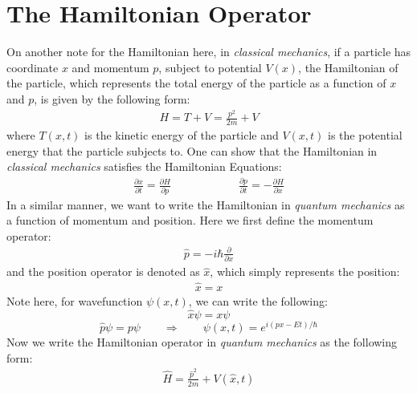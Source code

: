 \documentclass[11pt]{book}
\theoremstyle{break}
\theoremstyle{break}
\newcommand{\pd}{\partial}
\begin{document}
\section[The Hamiltonian Operator]{\color{red}The Hamiltonian Operator\color{black}}
On another note for the Hamiltonian here, in \textit{classical mechanics}, if a particle has coordinate $x$ and momentum $p$, subject to potential $V(x)$, the Hamiltonian of the particle, which represents the total energy of the particle as a function of $x$ and $p$, is given by the following form:
\begin{align*}
H = T+V = \frac{p^2}{2m}+V
\end{align*}
where $T(x,t)$ is the kinetic energy of the particle and $V(x,t)$ is the potential energy that the particle subjects to. One can show that the Hamiltonian in \textit{classical mechanics} satisfies the Hamiltonian Equations:
\begin{align*}
\frac{\pd x}{\pd t} = \frac{\pd H}{\pd p}  \qquad\qquad\qquad \frac{\pd p}{\pd t} = -\frac{\pd H}{\pd x}
\end{align*}
In a similar manner, we want to write the Hamiltonian in \textit{quantum mechanics} as a function of momentum and position. Here we first define the momentum operator:
\begin{align*}
\hat{p} = -i\hbar \frac{\pd}{\pd x}
\end{align*}
and the position operator is denoted as $\hat{x}$, which simply represents the position:
\begin{align*}
\hat{x} = x 
\end{align*}
Note here, for wavefunction $\psi(x,t)$, we can write the following:
$$\hat{x}\psi = x\psi$$ 
$$\hat{p}\psi = p \psi \qquad \Rightarrow \qquad \psi(x,t) = e^{i(px-Et)/\hbar}$$
Now we write the Hamiltonian operator in \textit{quantum mechanics} as the following form:
\begin{align*}
\hat{H} = \frac{\hat{p}^2}{2m} + V(\hat{x},t)
\end{align*}
\end{document}

